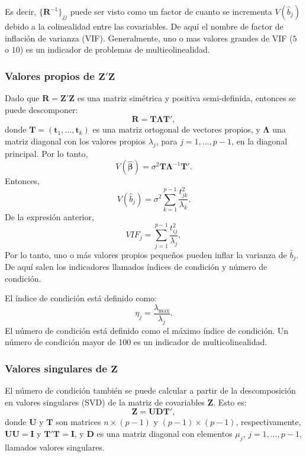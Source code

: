 \documentclass[
]{article}
\begin{document}
Es decir, \(\{\boldsymbol R^{-1}\}_{jj}\) puede ser visto como un factor de cuanto se incrementa \(V(\widehat{b}_{j})\) debido a la colinealidad entre las covariables. De aquí el nombre de factor de inflación de varianza (VIF). Generalmente, uno o mas valores grandes de VIF (\(5\) o \(10\)) es un indicador de problemas de multicolinealidad.

\hypertarget{valores-propios-de-boldsymbol-zboldsymbol-z}{%
\subsubsection{\texorpdfstring{Valores propios de \(\boldsymbol Z'\boldsymbol Z\)}{Valores propios de \textbackslash boldsymbol Z'\textbackslash boldsymbol Z}}\label{valores-propios-de-boldsymbol-zboldsymbol-z}}

Dado que \(\boldsymbol R= \boldsymbol Z'\boldsymbol Z\) es una matriz simétrica y positiva semi-definida, entonces se puede descomponer:
\[
\boldsymbol R= \boldsymbol T\boldsymbol \Lambda\boldsymbol T',
\]
donde \(\boldsymbol T= (\boldsymbol t_{1},\ldots,\boldsymbol t_{k})\) es una matriz ortogonal de vectores propios, y \(\boldsymbol \Lambda\) una matriz diagonal con los valores propios \(\lambda_{j}\), para \(j=1,\ldots,p-1\), en la diagonal principal. Por lo tanto,
\[
V(\widehat{\boldsymbol \beta}) = \sigma^{2}\boldsymbol T\boldsymbol \Lambda^{-1}\boldsymbol T'.
\]
Entonces,
\[
V(\widehat{b}_{j}) = \sigma^{2}\sum_{k=1}^{p-1}\frac{t_{jk}^{2}}{\lambda_{k}}.
\]
De la expresión anterior,
\[
VIF_{j} = \sum_{j=1}^{p-1}\frac{t_{ij}^{2}}{\lambda_{j}},
\]
Por lo tanto, uno o más valores propios pequeños pueden inflar la varianza de \(\widehat{b}_{j}\). De aquí salen los indicadores llamados índices de condición y número de condición.

El índice de condición está definido como:
\[
\eta_{j} = \frac{\lambda_{\mbox{max}}}{\lambda_{j}}.
\]
El número de condición está definido como el máximo índice de condición. Un número de condición mayor de 100 es un indicador de multicolinealidad.

\hypertarget{valores-singulares-de-boldsymbol-z}{%
\subsubsection{\texorpdfstring{Valores singulares de \(\boldsymbol Z\)}{Valores singulares de \textbackslash boldsymbol Z}}\label{valores-singulares-de-boldsymbol-z}}

El número de condición también se puede calcular a partir de la descomposición en valores singulares (SVD) de la matriz de covariables \(\boldsymbol Z\). Esto es:
\[
\boldsymbol Z=\boldsymbol U\boldsymbol D\boldsymbol T',
\]
donde \(\boldsymbol U\) y \(\boldsymbol T\) son matrices \(n\times (p-1)\) y \((p-1)\times (p-1)\), respectivamente, \(\boldsymbol U\boldsymbol U= \boldsymbol I\) y \(\boldsymbol T'\boldsymbol T= \boldsymbol I\), y \(\boldsymbol D\) es una matriz diagonal con elementos \(\mu_{j}\), \(j=1,\ldots,p-1\), llamados valores singulares.
\end{document}
